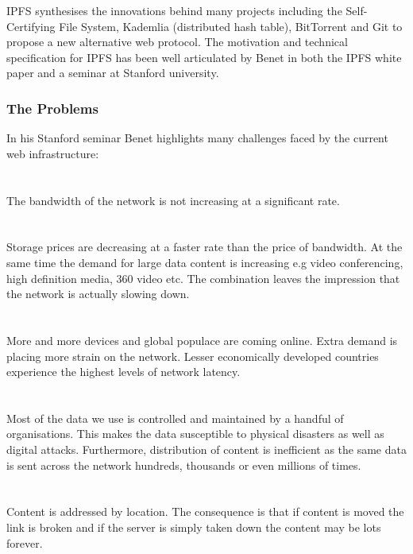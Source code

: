IPFS synthesises the innovations behind many projects including the Self-Certifying File System\cite{mazieres1998escaping}, Kademlia\cite{maymounkov2002kademlia} (distributed hash table), BitTorrent and Git to propose a new alternative web protocol. The motivation and technical specification for IPFS has been well articulated by Benet in both the IPFS white paper\cite{benet2014ipfs} and a seminar at Stanford university\cite{IPFSVid}.

\subsubsection{The Problems}
In his Stanford seminar Benet highlights many challenges faced by the current web infrastructure:\\
\\
\\
The bandwidth of the network is not increasing at a significant rate. \\
\\
\\
Storage prices are decreasing at a faster rate than the price of bandwidth. At the same time the demand for large data content is increasing e.g video conferencing, high definition media, 360 video etc. The combination leaves the impression that the network is actually slowing down.\\
\\
\\
More and more devices and global populace are coming online. Extra demand is placing more strain on the network. Lesser economically developed countries experience the highest levels of network latency.\\
\\
\\
Most of the data we use is controlled and maintained by a handful of organisations. This makes the data susceptible to physical disasters\cite{DCFire} as well as digital attacks. Furthermore, distribution of content is inefficient as the same data is sent across the network hundreds, thousands or even millions of times.\\
\\
\\
Content is addressed by location. The consequence is that if content is moved the link is broken and if the server is simply taken down the content may be lots forever.\\
\\
